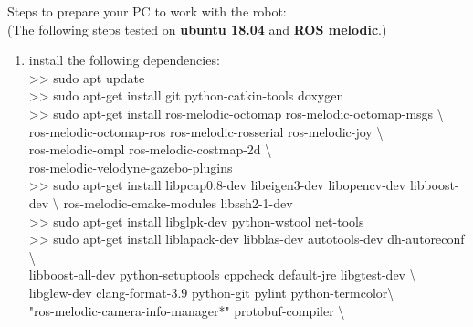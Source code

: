 \documentclass[a4paper,12pt]{article}
\begin{document}
Steps to prepare your PC to work with the robot:\\
(The following steps tested on \textbf{ubuntu 18.04} and \textbf{ROS melodic}.)
\begin{enumerate}
    \item install the following dependencies:\\
    {\selectfont \colorbox{gray!30}{>> sudo apt update }}\\
{\selectfont  \colorbox{gray!30}{>> sudo apt-get install git python-catkin-tools doxygen}}\\
{\selectfont  \colorbox{gray!30}{>> sudo apt-get install ros-melodic-octomap ros-melodic-octomap-msgs \textbackslash }}\\ 
{\selectfont  \colorbox{gray!30}{\hspace{2.5cm}  ros-melodic-octomap-ros ros-melodic-rosserial ros-melodic-joy \textbackslash}}\\
{\selectfont  \colorbox{gray!30}{\hspace{2.5cm}ros-melodic-ompl ros-melodic-costmap-2d \textbackslash}}\\ {\selectfont  \colorbox{gray!30}{\hspace{2.5cm}ros-melodic-velodyne-gazebo-plugins}}\\
{\selectfont  \colorbox{gray!30}{>> sudo apt-get install libpcap0.8-dev libeigen3-dev libopencv-dev libboost-dev \textbackslash}}
{\selectfont  \colorbox{gray!30}{\hspace{2.5cm}ros-melodic-cmake-modules libssh2-1-dev}}\\
{\selectfont  \colorbox{gray!30}{>> sudo apt-get install libglpk-dev python-wstool net-tools}}\\
{\selectfont  \colorbox{gray!30}{>> sudo apt-get install liblapack-dev libblas-dev autotools-dev dh-autoreconf \textbackslash}} \\
{\selectfont  \colorbox{gray!30}{\hspace{2.5cm}libboost-all-dev python-setuptools cppcheck default-jre libgtest-dev \textbackslash}}\ \\
{\selectfont  \colorbox{gray!30}{\hspace{2.5cm}libglew-dev clang-format-3.9 python-git pylint python-termcolor\textbackslash}} \\
{\selectfont  \colorbox{gray!30}{\hspace{2.5cm} "ros-melodic-camera-info-manager*" protobuf-compiler \textbackslash}} \\

\end{enumerate}
\end{document}
